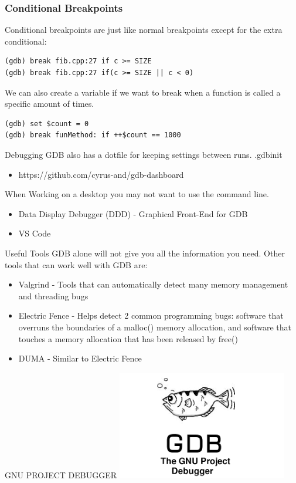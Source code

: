 \documentclass[11pt]{beamer}
\begin{document}
\begin{frame}[fragile]
\frametitle{Conditional Breakpoints}
Conditional breakpoints are just like normal breakpoints except for the extra conditional:
\begin{lstlisting}[style=BashInputStyle]
(gdb) break fib.cpp:27 if c >= SIZE
(gdb) break fib.cpp:27 if(c >= SIZE || c < 0)
\end{lstlisting}
We can also create a variable if we want to break when a function is called a specific amount of times.
\begin{lstlisting}[style=BashInputStyle]
(gdb) set $count = 0
(gdb) break funMethod: if ++$count == 1000
\end{lstlisting}
\end{frame}


\begin{frame}{Debugging}
GDB also has a dotfile for keeping settings between runs. .gdbinit
\begin{itemize}
\item https://github.com/cyrus-and/gdb-dashboard
\end{itemize}
When Working on a desktop you may not want to use the command line.
\begin{itemize}
\item Data Display Debugger (DDD) - Graphical Front-End for GDB
\item VS Code
\end{itemize}
\end{frame}

\begin{frame}{Useful Tools}
GDB alone will not give you all the information you need. Other tools that can work well with GDB are:
\begin{itemize}
\item Valgrind - Tools that can automatically detect many memory management and threading bugs
\item Electric Fence - Helps detect 2 common programming bugs: software that overruns the boundaries of a malloc() memory allocation, and software that touches a memory allocation that has been released by free()
\item DUMA - Similar to Electric Fence
\end{itemize}
\end{frame}

\begin{frame}{GNU PROJECT DEBUGGER}
\includegraphics{src/gdb_logo.png}
\end{frame}
\end{document}
